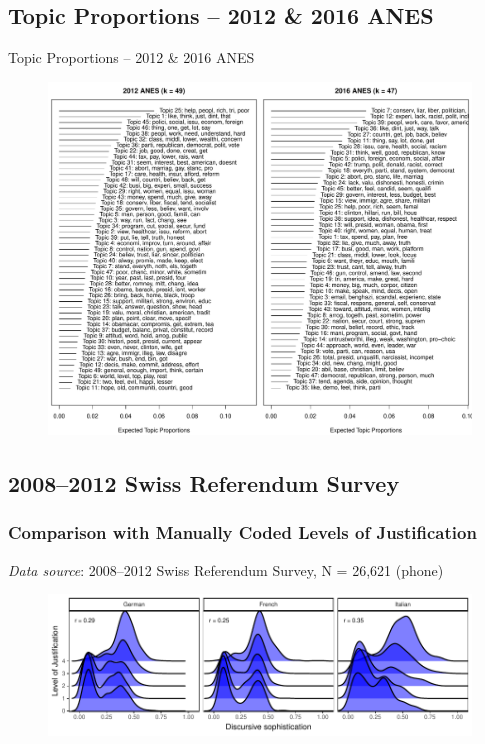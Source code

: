 \subsection{Topic Proportions -- 2012 \& 2016 ANES}
\begin{frame}{Topic Proportions -- 2012 \& 2016 ANES}\label{stm}
\begin{figure}
	\includegraphics[height=.9\textheight]{../fig/anes_stm_prop.pdf}
\end{figure}
\end{frame}

\subsection{2008--2012 Swiss Referendum Survey}

\begin{frame} %
\frametitle{Comparison with Manually Coded Levels of Justification}
\emph{Data source}: 2008--2012 Swiss Referendum Survey, N = 26,621 (phone)
\begin{figure}
	\includegraphics[width=\textwidth]{../fig/swiss_ggridges.pdf}
\end{figure}
\end{frame}

